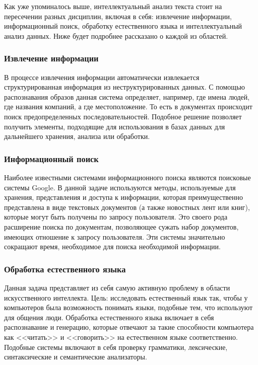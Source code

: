 \documentclass[14pt]{matmex-diploma-custom}
\begin{document}
Как уже упоминалось выше, интеллектуальный анализ текста стоит на пересечении разных дисциплин, включая в себя: извлечение информации, информационный поиск, обработку естественного языка и интеллектуальный анализ данных. Ниже будет подробнее рассказано о каждой из областей.

\subsubsection{Извлечение информации}

В процессе извлечения информации автоматически извлекается структурированная информация из неструктурированных данных. С помощью распознавания образов данная система определяет, например, где имена людей, где названия компаний, а где местоположение. То есть в документах происходит поиск предопределенных последовательностей. Подобное решение позволяет получить элементы, подходящие для использования в базах данных для дальнейшего хранения, анализа или обработки.

\subsubsection{Информационный поиск}

Наиболее известными системами информационного поиска являются поисковые системы Google. В данной задаче используются методы, используемые для хранения, представления и доступа к информации, которая преимущественно представлена в виде текстовых документов (а также новостных лент или книг), которые могут быть получены по запросу пользователя. Это своего рода расширение поиска по документам, позволяющее сужать набор документов, имеющих отношение к запросу пользователя. Эти системы значительно сокращают время, необходимое для поиска необходимой информации.

\subsubsection{Обработка естественного языка}

Данная задача представляет из себя самую активную проблему в области искусственного интеллекта. Цель: исследовать естественный язык так, чтобы у компьютеров была возможность понимать языки, подобные тем, что используют для общения люди. Обработка естественного языка включает в себя распознавание и генерацию, которые отвечают за такие способности компьютера как <<читать>> и <<говорить>> на естественном языке соответственно. Подобные системы включают в себя проверку грамматики, лексические, синтаксические и семантические анализаторы.
\end{document}
